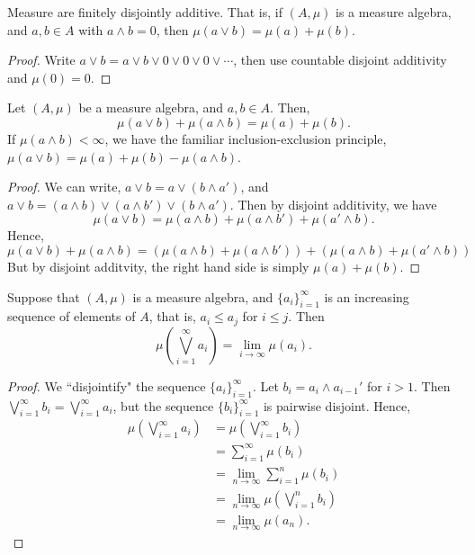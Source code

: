 \documentclass{owmaths}
\begin{document}
\begin{proposition}
    Measure are finitely disjointly additive. That is, if $(A,\mu)$ is a measure
    algebra, and $a,b \in A$ with $a \wedge b = 0$, then $\mu(a \vee b) = \mu(a) + \mu(b)$.
\end{proposition}
\begin{proof}
    Write $a \vee b = a \vee b \vee 0 \vee 0 \vee 0 \vee \cdots$, then use
    countable disjoint additivity and $\mu(0) = 0$.
\end{proof}
\begin{proposition}
    Let $(A,\mu)$ be a measure algebra, and $a,b \in A$. Then,
    \begin{equation*}
        \mu(a \vee b) + \mu(a \wedge b) = \mu(a) + \mu(b).
    \end{equation*}
    If $\mu(a \wedge b) < \infty$, we have the familiar inclusion-exclusion principle,
    $\mu(a\vee b) = \mu(a) + \mu(b) - \mu(a \wedge b)$.
\end{proposition}
\begin{proof}
    We can write, $a \vee b = a \vee ( b \wedge a')$, and $a \vee b = (a \wedge b) \vee (a \wedge b') \vee (b \wedge a')$. 
    Then by disjoint additivity, we have
    \begin{equation*}
        \mu(a \vee b) = \mu(a\wedge b) + \mu(a \wedge b') + \mu(a' \wedge b).
    \end{equation*}
    Hence,
    \begin{equation*}
        \mu(a \vee b)+\mu(a\wedge b) = (\mu(a\wedge b) + \mu(a \wedge b')) + (\mu(a \wedge b) + \mu(a'\wedge b))
    \end{equation*}
    But by disjoint additvity, the right hand side is simply $\mu(a) + \mu(b)$.
    
\end{proof} 
\begin{proposition}
    Suppose that $(A,\mu)$ is a measure algebra, and $\{a_i\}_{i=1}^\infty$
    is an increasing sequence of elements of $A$, that is, $a_i \leq a_j$
    for $i \leq j$. Then
    \begin{equation*}
        \mu\left(\bigvee_{i=1}^\infty a_i\right) = \lim_{i\rightarrow\infty} \mu(a_i).
    \end{equation*}
\end{proposition}
\begin{proof}
    We ``disjointify" the sequence $\{a_i\}_{i=1}^\infty$. Let $b_i = a_i \wedge a_{i-1}'$
    for $i>1$. Then $\bigvee_{i=1}^\infty b_i = \bigvee_{i=1}^\infty a_i$, but 
    the sequence $\{b_i\}_{i=1}^\infty$ is pairwise disjoint. Hence,
    \begin{align*}
        \mu\left(\bigvee_{i=1}^\infty a_i\right) &= \mu\left(\bigvee_{i=1}^\infty b_i\right)\\
        &= \sum_{i=1}^\infty \mu(b_i)\\
        &= \lim_{n\rightarrow\infty} \sum_{i=1}^n \mu(b_i)\\
        &= \lim_{n\rightarrow \infty} \mu\left(\bigvee_{i=1}^n b_i\right)\\
        &= \lim_{n\rightarrow\infty} \mu(a_n).
    \end{align*}
\end{proof}
\end{document}
